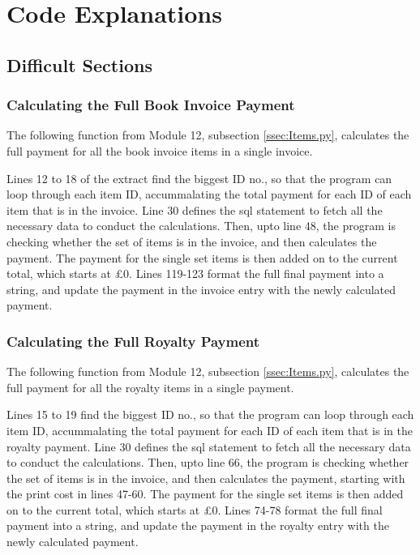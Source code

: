 \section{Code Explanations}

\subsection{Difficult Sections}

\subsubsection{Calculating the Full Book Invoice Payment}
The following function from Module 12, subsection \ref{ssec:Items.py}, calculates the full payment for all the book invoice items in a single invoice.
\begin{tiny}
\end{tiny} 
Lines 12 to 18 of the extract find the biggest ID no., so that the program can loop through each item ID, accummalating the total payment for each ID of each item that is in the invoice. Line 30 defines the sql statement to fetch all the necessary data to conduct the calculations. Then, upto line 48, the program is checking whether the set of items is in the invoice, and then calculates the payment. The payment for the single set items is then added on to the current total, which starts at £0. Lines 119-123 format the full final payment into a string, and update the payment in the invoice entry with the newly calculated payment.


\subsubsection{Calculating the Full Royalty Payment}
The following function from Module 12, subsection \ref{ssec:Items.py}, calculates the full payment for all the royalty items in a single payment.
\begin{tiny}
\end{tiny}
Lines 15 to 19 find the biggest ID no., so that the program can loop through each item ID, accummalating the total payment for each ID of each item that is in the royalty payment. Line 30 defines the sql statement to fetch all the necessary data to conduct the calculations. Then, upto line 66, the program is checking whether the set of items is in the invoice, and then calculates the payment, starting with the print cost in lines 47-60. The payment for the single set items is then added on to the current total, which starts at £0. Lines 74-78 format the full final payment into a string, and update the payment in the royalty entry with the newly calculated payment.


